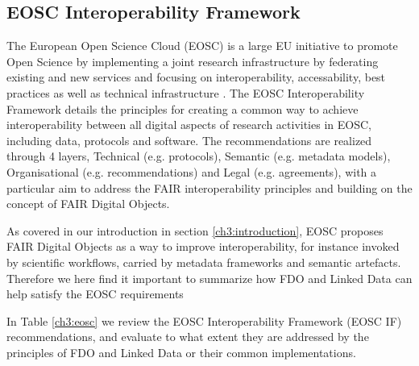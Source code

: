 \subsection{EOSC Interoperability Framework}\label{ch3:eosc-interoperability-framework}

The European Open Science Cloud (EOSC) is a large EU initiative to promote Open Science by implementing a joint research infrastructure by federating existing and new services and focusing on interoperability, accessability, best practices as well as technical infrastructure \cite{10.2777/940154}. The EOSC Interoperability Framework \cite{eosc-interop-framework} details the principles for creating a common way to achieve interoperability between all digital aspects of research activities in EOSC, including data, protocols and software. The recommendations are realized through 4 layers, Technical (e.g. protocols), Semantic (e.g. metadata models), Organisational (e.g. recommendations) and Legal (e.g. agreements), with a particular aim to address the FAIR interoperability principles and building on the concept of FAIR Digital Objects. 

As covered in our introduction in section \vref{ch3:introduction}, EOSC proposes FAIR Digital Objects as a way to improve interoperability, for instance invoked by scientific workflows, carried by metadata frameworks and semantic artefacts. Therefore we here find it important to summarize how FDO and Linked Data can help satisfy the EOSC requirements

In Table \vref{ch3:eosc} we review the EOSC Interoperability Framework (EOSC IF) recommendations, and evaluate to what extent they are addressed by the principles of FDO and Linked Data or their common implementations.

